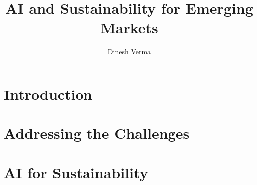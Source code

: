 \documentclass[krantz1,ChapterTOCs]{krantz}
\begin{document}


\frontmatter

\title{AI and Sustainability for Emerging Markets}
\author{Dinesh Verma}
\maketitle







\setcounter{page}{7} %
\tableofcontents


\listoffigures
\listoftables

%

\mainmatter

\part{Introduction}
%





\part{Addressing the Challenges}






\part{AI for Sustainability}




%





\printindex
\cleardoublepage
\end{document}
